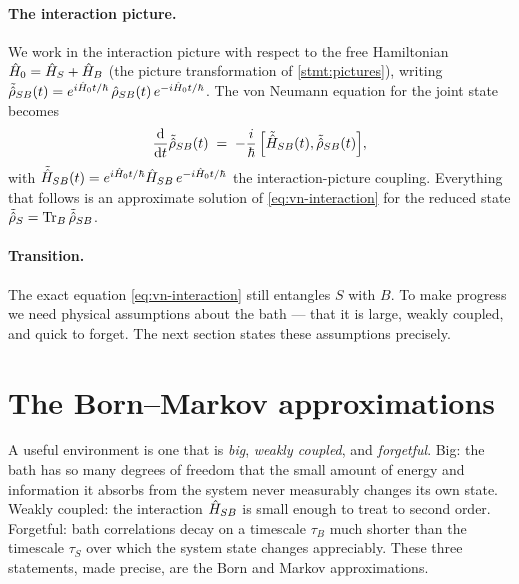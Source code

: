 \paragraph{The interaction picture.}
We work in the interaction picture with respect to the free
Hamiltonian $\hat{H}_0=\hat{H}_S+\hat{H}_B$ (the picture transformation of
\cref{stmt:pictures}), writing
$\tilde{\hat{\rho}}_{SB}(t)=e^{i\hat{H}_0 t/\hbar}\,\hat{\rho}_{SB}(t)\,e^{-i\hat{H}_0 t/\hbar}$.
The von Neumann equation for the joint state becomes
\begin{equation}
\label{eq:vn-interaction}
\frac{\dd}{\dd t}\tilde{\op\rho}_{SB}(t)
\;=\; -\frac{i}{\hbar}\,\comm{\tilde{\op H}_{SB}(t)}{\tilde{\op\rho}_{SB}(t)},
\end{equation}
with $\tilde{\hat{H}}_{SB}(t)=e^{i\hat{H}_0 t/\hbar}\hat{H}_{SB}\,e^{-i\hat{H}_0 t/\hbar}$
the interaction-picture coupling. Everything that follows is an
approximate solution of \cref{eq:vn-interaction} for the reduced
state $\tilde{\hat{\rho}}_S=\operatorname{Tr}_B\tilde{\hat{\rho}}_{SB}$.

\paragraph{Transition.}
The exact equation \cref{eq:vn-interaction} still entangles $S$
with $B$. To make progress we need physical assumptions about the
bath --- that it is large, weakly coupled, and quick to forget. The
next section states these assumptions precisely.

\section{The Born--Markov approximations}
\label{sec:born-markov}

\begin{phenomenon}
A useful environment is one that is \emph{big}, \emph{weakly
coupled}, and \emph{forgetful}. Big: the bath has so many degrees
of freedom that the small amount of energy and information it
absorbs from the system never measurably changes its own state.
Weakly coupled: the interaction $\hat{H}_{SB}$ is small enough to
treat to second order. Forgetful: bath correlations decay on a
timescale $\tau_B$ much shorter than the timescale $\tau_S$ over
which the system state changes appreciably. These three statements,
made precise, are the Born and Markov approximations.
\end{phenomenon}

